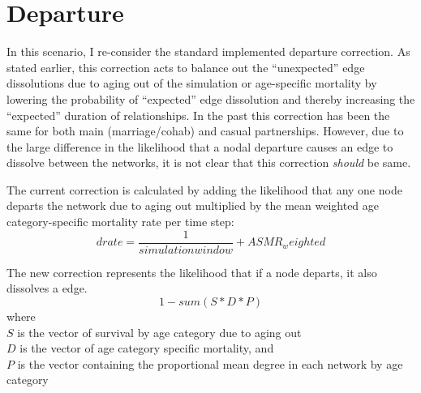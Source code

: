 \documentclass [11pt, proquest] {uwthesis}[2015/03/03]
\begin{document}
\section{Departure}\label{departure}

In this scenario, I re-consider the standard implemented departure
correction. As stated earlier, this correction acts to balance out the
``unexpected'' edge dissolutions due to aging out of the simulation or
age-specific mortality by lowering the probability of ``expected'' edge
dissolution and thereby increasing the ``expected'' duration of
relationships. In the past this correction has been the same for both
main (marriage/cohab) and casual partnerships. However, due to the large
difference in the likelihood that a nodal departure causes an edge to
dissolve between the networks, it is not clear that this correction
\emph{should} be same.

The current correction is calculated by adding the likelihood that any
one node departs the network due to aging out multiplied by the mean
weighted age category-specific mortality rate per time step:\\
\[drate = \frac{1}{simulation window} + ASMR_weighted\]

The new correction represents the likelihood that if a node departs, it
also dissolves a edge. \[1-sum(S*D*P)\] where\\
\(S\) is the vector of survival by age category due to aging out\\
\(D\) is the vector of age category specific mortality, and\\
\(P\) is the vector containing the proportional mean degree in each
network by age category
\end{document}
